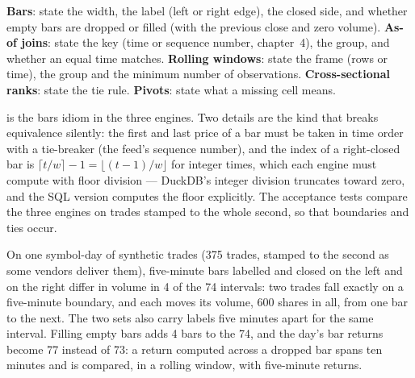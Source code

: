 \begin{method}\label{met:pl:dataframes:idioms}
\textbf{Bars}: state the width, the label (left or right edge), the closed side, and whether empty bars are dropped or filled (with
the previous close and zero volume). \textbf{As-of joins}: state the key (time or sequence number, chapter~4), the group, and whether
an equal time matches. \textbf{Rolling windows}: state the frame (rows or time), the group and the minimum number of observations.
\textbf{Cross-sectional ranks}: state the tie rule. \textbf{Pivots}: state what a missing cell means.
\end{method}

\label{lst:pl:dataframes:bars}

 is the bars idiom in the three engines. Two details are the kind that breaks equivalence silently: the
first and last price of a bar must be taken in time order with a tie-breaker (the feed's sequence number), and the index of a
right-closed bar is $\lceil t/w \rceil - 1 = \lfloor (t-1)/w \rfloor$ for integer times, which each engine must compute with floor
division --- DuckDB's integer division truncates toward zero, and the SQL version computes the floor explicitly. The acceptance tests
compare the three engines on trades stamped to the whole second, so that boundaries and ties occur.

\begin{example}\label{ex:pl:dataframes:bars}
On one symbol-day of synthetic trades (375 trades, stamped to the second as some vendors deliver them), five-minute bars labelled
and closed on the left and on the right differ in volume in 4 of the 74 intervals: two trades fall exactly on a five-minute boundary,
and each moves its volume, 600 shares in all, from one bar to the next. The two sets also carry labels five minutes apart for the same
interval. Filling empty bars adds 4 bars to the 74, and the day's bar returns become 77 instead of 73: a return computed across a
dropped bar spans ten minutes and is compared, in a rolling window, with five-minute returns.
\end{example}

